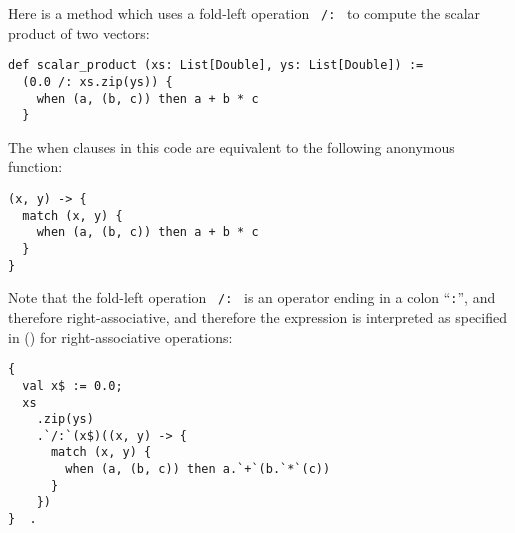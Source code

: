 \example Here is a method which uses a fold-left operation ~\lstinline!/:!~ to compute the scalar product of two vectors:
\begin{lstlisting}
def scalar_product (xs: List[Double], ys: List[Double]) := 
  (0.0 /: xs.zip(ys)) {
    when (a, (b, c)) then a + b * c
  }
\end{lstlisting}
The when clauses in this code are equivalent to the following anonymous function:
\begin{lstlisting}
(x, y) -> { 
  match (x, y) {
    when (a, (b, c)) then a + b * c
  }
}
\end{lstlisting}
Note that the fold-left operation ~\lstinline!/:!~ is an operator ending in a colon ``\lstinline!:!'', and therefore right-associative, and therefore the expression is interpreted as specified in () for right-associative operations: 

\begin{minipage}{\linewidth}
\begin{lstlisting}[mathescape=false]
{ 
  val x$ := 0.0; 
  xs
    .zip(ys)
    .`/:`(x$)((x, y) -> {
      match (x, y) {
        when (a, (b, c)) then a.`+`(b.`*`(c))
      }
    })
}  . 
\end{lstlisting}
\end{minipage}










